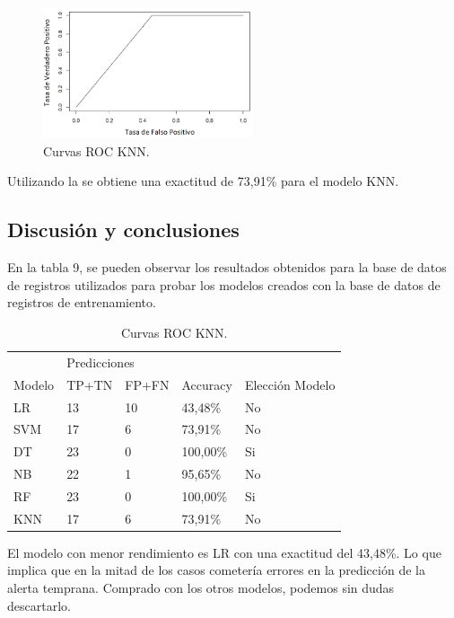 \documentclass{textolivre}
\begin{document}
\begin{figure}[htbp]
 \centering
 \includegraphics[width=0.55\textwidth]{figura13.png}
 \caption{Curvas ROC KNN.}
 \label{figura13}
\end{figure}

Utilizando la  se obtiene una exactitud de 73,91\% para el modelo KNN.

\subsection{Discusión y conclusiones}
En la tabla 9, se pueden observar los resultados obtenidos para la base de datos de registros utilizados para probar los modelos creados con la base de datos de registros de entrenamiento.

\begin{table}[htpb]
\centering
\caption{Curvas ROC KNN.}
\label{tab9}
\begin{tabular}{lllll}
\toprule 
 & \multicolumn{3}{l}{Predicciones}  & \\ 
\cmidrule{2-4}
Modelo     & TP+TN      & FP+FN     & Accuracy     & Elección Modelo
\\ 
\midrule
LR         & 13         & 10       & 43,48\%       & No
\\ 
SVM        & 17         & 6        & 73,91\%       & No
\\
DT         & 23         & 0        & 100,00\%      & Si
\\
NB         & 22         & 1        & 95,65\%       & No
\\
RF         & 23         & 0        & 100,00\%      & Si
\\
KNN        & 17         & 6        & 73,91\%       & No
\\
\bottomrule
\end{tabular}
\end{table}

El modelo con menor rendimiento es LR con una exactitud del 43,48\%. Lo que implica que en la mitad de los casos cometería errores en la predicción de la alerta temprana. Comprado con los otros modelos, podemos sin dudas descartarlo.
\end{document}

